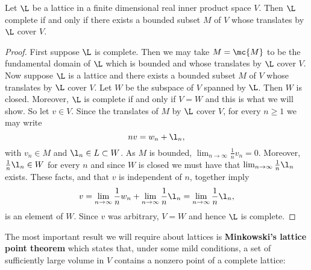     \begin{proposition}\label{prop:complete_lattice_if_and_only_if_bounded_translates_cover}
      Let $\L$ be a lattice in a finite dimensional real inner product space $V$. Then $\L$ complete if and only if there exists a bounded subset $M$ of $V$ whose translates by $\L$ cover $V$.
    \end{proposition}
    \begin{proof}
      First suppose $\L$ is complete. Then we may take $M = \mc{M}$ to be the fundamental domain of $\L$ which is bounded and whose translates by $\L$ cover $V$. Now suppose $\L$ is a lattice and there exists a bounded subset $M$ of $V$ whose translates by $\L$ cover $V$. Let $W$ be the subspace of $V$ spanned by $\L$. Then $W$ is closed. Moreover, $\L$ is complete if and only if $V = W$ and this is what we will show. So let $v \in V$. Since the translates of $M$ by $\L$ cover $V$, for every $n \ge 1$ we may write
      \[
        nv = w_{n}+\l_{n},
      \]
      with $v_{n} \in M$ and $\l_{n} \in L \subset W$. As $M$ is bounded, $\lim_{n \to \infty}\frac{1}{n}v_{n} = 0$. Moreover, $\frac{1}{n}\l_{n} \in W$ for every $n$ and since $W$ is closed we must have that $\lim_{n \to \infty}\frac{1}{n}\l_{n}$ exists. These facts, and that $v$ is independent of $n$, together imply
      \[
        v = \lim_{n \to \infty}\frac{1}{n}w_{n}+\lim_{n \to \infty}\frac{1}{n}\l_{n} = \lim_{n \to \infty}\frac{1}{n}\l_{n},
      \]
      is an element of $W$. Since $v$ was arbitrary, $V = W$ and hence $\L$ is complete.
    \end{proof}

    The most important result we will require about lattices is \textbf{Minkowski's lattice point theorem} which states that, under some mild conditions, a set of sufficiently large volume in $V$ contains a nonzero point of a complete lattice:

